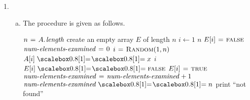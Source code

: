 \begin{enumerate}[\thechapter-1]
\begin{enumerate}[(a)]
\end{enumerate}
%
\item
\begin{enumerate}[(a)]
\item The procedure is given as follows.
\begin{codebox}
\li $n \gets \attrib{A}{length}$
\li create an empty array $E$ of length $n$
\li \For $i \gets 1$ \To $n$
\li \Do
        $E[i] \mathrel{\hspace{1pt}=\hspace{1pt}} \textnormal{\scshape false}$
    \End
\li $\id{num-elements-examined} \gets 0$
\li \Repeat
\li      $i \mathrel{\hspace{1pt}=\hspace{1pt}} \textnormal{\scshape Random}(1, n)$
\li      \If $A[i] \isequal x$
\li          \Then
                   \Return $i$
\li          \Else
                   \If $E[i] \isequal \const{false}$
\li                    \Then
                             $E[i] \mathrel{\hspace{1pt}=\hspace{1pt}} \textnormal{\scshape true}$
\li                          $\id{num-elements-examined} \gets \id{num-elements-examined} + 1$
                       \End
             \End
\li \Until $\id{num-elements-examined} \isequal n$
\li print ``not found''
\end{codebox}
\end{enumerate}
%
\end{enumerate}